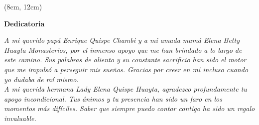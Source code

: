 \null
\vfill
\begin{textblock*}{10cm}(8cm, 12cm)
  \begin{flushright}
    \large \textbf{Dedicatoria}
  \end{flushright}
  \noindent
  \textit{A mi querido papá Enrique Quispe Chambi y a mi amada mamá Elena Betty Huayta Monasterios, por el inmenso apoyo que me han brindado a lo largo de este camino. Sus palabras de aliento y su constante sacrificio han sido el motor que me impulsó a perseguir mis sueños. Gracias por creer en mí incluso cuando yo dudaba de mí mismo. \\}
  \textit{A mi querida hermana Lady Elena Quispe Huayta, agradezco profundamente tu apoyo incondicional. Tus ánimos y tu presencia han sido un faro en los momentos más difíciles. Saber que siempre puedo contar contigo ha sido un regalo invaluable.}
\end{textblock*}
\vfill
\null
